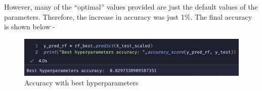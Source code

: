 \documentclass[a4, 11pt]{article}
\begin{document}
However, many of the ``optimal'' values provided are just the default values of the parameters. Therefore, the increase in accuracy was just 
1\%. The final accuracy is shown below -
\begin{figure}[H]
    \center
    \includegraphics[scale=0.4]{fourth.png}
    \caption{Accuracy with best hyperparameters}
\end{figure}
\end{document}
